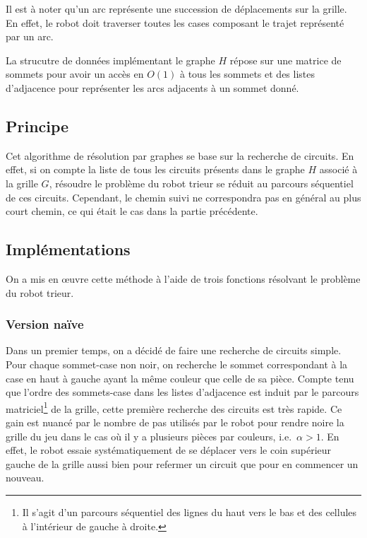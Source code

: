 \documentclass[12pt,a4paper]{article}
\begin{document}
Il est \`a noter qu'un arc repr\'esente une succession de d\'eplacements sur la 
grille. En effet, le robot doit traverser toutes les cases composant le trajet 
repr\'esent\'e par un arc.

La strucutre de donn\'ees impl\'ementant le graphe $H$ r\'epose sur une matrice 
de sommets pour avoir un acc\`es en $O(1)$ \`a tous les sommets et des listes 
d'adjacence pour repr\'esenter les arcs adjacents \`a un sommet donn\'e. 

\subsection*{Principe}
Cet algorithme de r\'esolution par graphes se base sur la recherche de 
circuits. En effet, si on compte la liste de tous les circuits pr\'esents dans 
le graphe $H$ associ\'e \`a la grille $G$, r\'esoudre le probl\`eme du robot 
trieur se r\'eduit au parcours s\'equentiel de ces circuits. Cependant, le 
chemin suivi ne correspondra pas en g\'en\'eral au plus court chemin, ce qui 
\'etait le cas dans la partie pr\'ec\'edente.

\subsection*{Impl\'ementations}
On a mis en \oe uvre cette m\'ethode \`a l'aide de trois fonctions r\'esolvant 
le probl\`eme du robot trieur.

\subsubsection*{Version na\"ive}
Dans un premier temps, on a d\'ecid\'e de faire une recherche de circuits 
simple. 
Pour chaque sommet-case non noir, on recherche le sommet correspondant \`a la 
case en haut \`a gauche ayant la m\^eme couleur que celle de sa pi\`ece. Compte 
tenu que l'ordre des sommets-case dans les listes d'adjacence est induit par le 
parcours matriciel\footnote{Il s'agit d'un parcours s\'equentiel des lignes du 
haut vers le bas et des cellules \`a l'int\'erieur de gauche \`a droite.} de la 
grille, cette premi\`ere recherche des circuits est tr\`es rapide. Ce gain est 
nuanc\'e par le nombre de pas utilis\'es par le robot pour rendre noire la 
grille du jeu dans le cas o\`u il y a plusieurs pi\`eces par couleurs, i.e.\ 
$\alpha > 1$. En effet, le robot essaie syst\'ematiquement de se d\'eplacer vers 
le coin sup\'erieur gauche de la grille aussi bien pour refermer un circuit que 
pour en commencer un nouveau.
\end{document}
